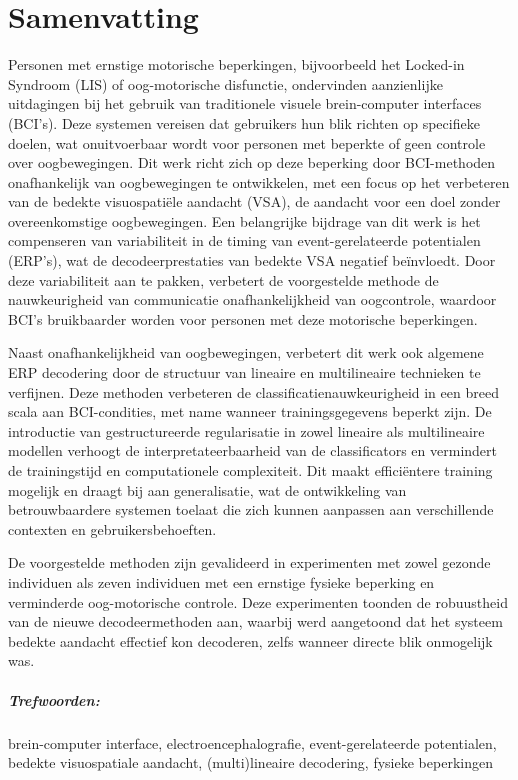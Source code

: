 \chapter*{Samenvatting}

Personen met ernstige motorische beperkingen, bijvoorbeeld het Locked-in
Syndroom (LIS) of oog-motorische disfunctie, ondervinden aanzienlijke
uitdagingen bij het gebruik van traditionele visuele brein-computer interfaces (BCI's).
Deze systemen vereisen dat gebruikers hun blik richten op specifieke doelen,
wat onuitvoerbaar wordt voor personen met beperkte of geen controle
over oogbewegingen.
Dit werk richt zich op deze beperking door BCI-methoden onafhankelijk van
oogbewegingen te ontwikkelen, met een focus op het verbeteren van de bedekte
visuospati\"ele aandacht (VSA), de  aandacht voor een doel zonder
overeenkomstige oogbewegingen.
Een belangrijke bijdrage van dit werk is het compenseren van variabiliteit in
de timing van event-gerelateerde potentialen (ERP's), wat de decodeerprestaties
van bedekte VSA negatief beïnvloedt.
Door deze variabiliteit aan te pakken, verbetert de voorgestelde methode de
nauwkeurigheid van communicatie onafhankelijkheid van oogcontrole,
waardoor BCI's bruikbaarder worden voor personen met deze motorische
beperkingen.

Naast onafhankelijkheid van oogbewegingen, verbetert dit werk ook algemene
ERP decodering door de structuur van lineaire en multilineaire technieken te verfijnen.
Deze methoden verbeteren de classificatienauwkeurigheid in een breed scala aan
BCI-condities, met name wanneer trainingsgegevens beperkt zijn.
De introductie van gestructureerde regularisatie in zowel lineaire als
multilineaire modellen verhoogt de interpretateerbaarheid van de classificators
en vermindert de trainingstijd en computationele complexiteit.
Dit maakt efficiëntere training mogelijk en draagt bij aan generalisatie, wat
de ontwikkeling van betrouwbaardere systemen toelaat die zich kunnen
aanpassen aan verschillende contexten en gebruikersbehoeften.

De voorgestelde methoden zijn gevalideerd in experimenten met zowel gezonde
individuen als zeven individuen met een ernstige fysieke beperking en verminderde
oog-motorische controle.
Deze experimenten toonden de robuustheid van de nieuwe decodeermethoden aan,
waarbij werd aangetoond dat het systeem bedekte aandacht effectief kon decoderen,
zelfs wanneer directe blik onmogelijk was.

\paragraph{Trefwoorden:}
brein-computer interface,
electroencephalografie,
event-gerelateerde potentialen,
bedekte visuospatiale aandacht,
(multi)lineaire decodering,
fysieke beperkingen
